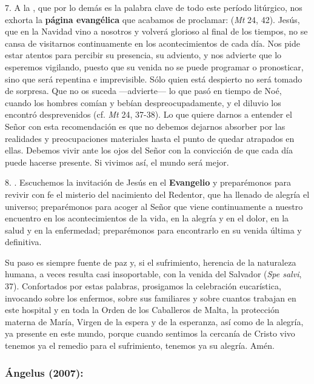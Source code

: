 \begin{body}
	7. A la , que por lo demás es la palabra clave de todo este período litúrgico, nos exhorta la \textbf{página evangélica} que acabamos de proclamar:  (\emph{Mt} 24, 42). Jesús, que en la Navidad vino a nosotros y volverá glorioso al final de los tiempos, no se cansa de visitarnos continuamente en los acontecimientos de cada día. Nos pide estar atentos para percibir su presencia, su adviento, y nos advierte que lo esperemos vigilando, puesto que su venida no se puede programar o pronosticar, sino que será repentina e imprevisible. Sólo quien está despierto no será tomado de sorpresa. Que no os suceda ---advierte--- lo que pasó en tiempo de Noé, cuando los hombres comían y bebían despreocupadamente, y el diluvio los encontró desprevenidos (cf. \emph{Mt} 24, 37-38). Lo que quiere darnos a entender el Señor con esta recomendación es que no debemos dejarnos absorber por las realidades y preocupaciones materiales hasta el punto de quedar atrapados en ellas. Debemos vivir ante los ojos del Señor con la convicción de que cada día puede hacerse presente. Si vivimos así, el mundo será mejor. 
	
	8. . Escuchemos la invitación de Jesús en el \textbf{Evangelio} y preparémonos para revivir con fe el misterio del nacimiento del Redentor, que ha llenado de alegría el universo; preparémonos para acoger al Señor que viene continuamente a nuestro encuentro en los acontecimientos de la vida, en la alegría y en el dolor, en la salud y en la enfermedad; preparémonos para encontrarlo en su venida última y definitiva. 
	
	Su paso es siempre fuente de paz y, si el sufrimiento, herencia de la naturaleza humana, a veces resulta casi insoportable, con la venida del Salvador  (\emph{Spe salvi}, 37). Confortados por estas palabras, prosigamos la celebración eucarística, invocando sobre los enfermos, sobre sus familiares y sobre cuantos trabajan en este hospital y en toda la Orden de los Caballeros de Malta, la protección materna de María, Virgen de la espera y de la esperanza, así como de la alegría, ya presente en este mundo, porque cuando sentimos la cercanía de Cristo vivo tenemos ya el remedio para el sufrimiento, tenemos ya su alegría. Amén.
\end{body}

\subsubsection{Ángelus (2007): }


